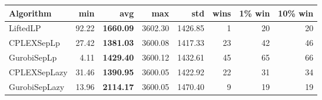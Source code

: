 \begin{tabular}{lrrrrrrr}
Algorithm & min & avg & max & std
& wins & 1\% win & 10\% win 
\\
\hline
LiftedLP&92.22& \bf1660.09& 3602.30& 1426.85&1&20&20\\
CPLEXSepLp&27.42& \bf1381.03& 3600.08& 1417.33&23&42&46\\
GurobiSepLp&4.11& \bf1429.40& 3600.12& 1432.61&45&65&66\\
CPLEXSepLazy&31.46& \bf1390.95& 3600.05& 1422.92&22&31&34\\
GurobiSepLazy&13.96& \bf2114.17& 3600.05& 1470.40&9&19&19
\end{tabular}
